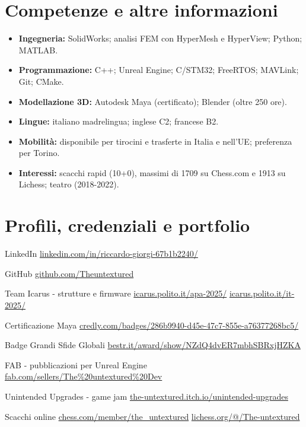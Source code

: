 \documentclass[a4paper,10pt]{article}
\begin{document}
\section*{Competenze e altre informazioni}
\begin{itemize}
  \item \textbf{Ingegneria:} SolidWorks; analisi FEM con HyperMesh e HyperView; Python; MATLAB.
  \item \textbf{Programmazione:} C++; Unreal Engine; C/STM32; FreeRTOS; MAVLink; Git; CMake.
  \item \textbf{Modellazione 3D:} Autodesk Maya (certificato); Blender (oltre 250 ore).
  \item \textbf{Lingue:} italiano madrelingua; inglese C2; francese B2.
  \item \textbf{Mobilità:} disponibile per tirocini e trasferte in Italia e nell'UE; preferenza per Torino.
  \item \textbf{Interessi:} scacchi rapid (10+0), massimi di 1709 su Chess.com e 1913 su Lichess; teatro (2018-2022).
\end{itemize}

\section*{Profili, credenziali e portfolio}
\begin{cvreferences}
  \item[LinkedIn] \url{linkedin.com/in/riccardo-giorgi-67b1b2240/}
  \item[GitHub] \url{github.com/Theuntextured}
  \item[Team Icarus - strutture e firmware]
    \url{icarus.polito.it/apa-2025/} \quad \url{icarus.polito.it/it-2025/}
  \item[Certificazione Maya] \url{credly.com/badges/286b9940-d45e-47c7-855e-a76377268bc5/}
  \item[Badge Grandi Sfide Globali] \url{bestr.it/award/show/NZdQ4dvER7mbhSBRxjHZKA}
  \item[FAB - pubblicazioni per Unreal Engine] \url{fab.com/sellers/The%20untextured%20Dev}
  \item[Unintended Upgrades - game jam] \url{the-untextured.itch.io/unintended-upgrades}
  \item[Scacchi online] \url{chess.com/member/the_untextured} \quad \url{lichess.org/@/The-untextured}
\end{cvreferences}
\end{document}

